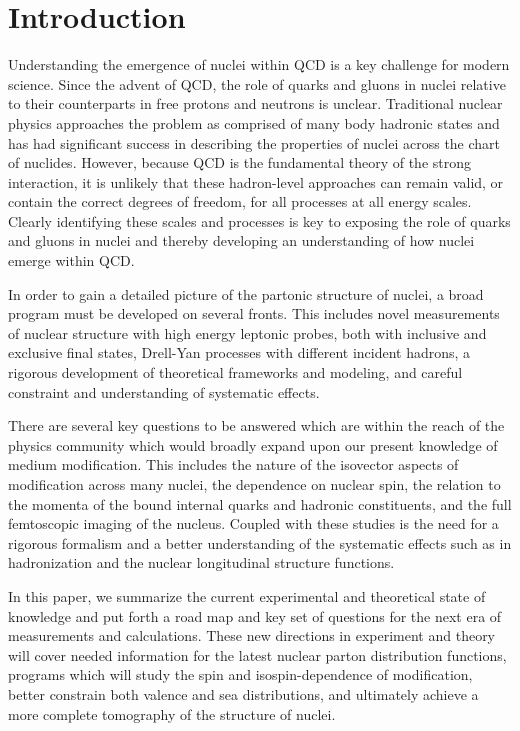 \section{Introduction}


Understanding the emergence of nuclei within QCD is a key challenge for modern science.  Since the advent of QCD, the role of quarks and gluons in nuclei relative to their counterparts in free protons and neutrons is unclear.  Traditional nuclear physics approaches the problem as comprised of many body hadronic states and has had significant success in describing the properties of nuclei across the chart of nuclides. However, because QCD is the fundamental theory of the strong interaction, it is unlikely that these hadron-level approaches can remain valid, or contain the correct degrees of freedom, for all processes at all energy scales. Clearly identifying these scales and processes is key to exposing the role of quarks and gluons in nuclei and thereby developing an understanding of how nuclei emerge within QCD.

In order to gain a detailed picture of the partonic structure of nuclei, a broad program must be developed on several fronts.  This includes novel measurements of nuclear structure with high energy leptonic probes, both with inclusive and exclusive final states, Drell-Yan processes with different incident hadrons, a rigorous development of theoretical frameworks and modeling, and  careful constraint and understanding of systematic effects.

There are several key questions to be answered which are within the reach of the physics community which would broadly expand upon our present knowledge of medium modification.  This includes the nature of the isovector aspects of modification across many nuclei, the dependence on nuclear spin, the relation to the momenta of the bound internal quarks and hadronic constituents, and the full femtoscopic imaging of the nucleus.  Coupled with these studies is the need for a rigorous formalism and a better understanding of the systematic effects such as in hadronization and the nuclear longitudinal structure functions. 

In this paper, we summarize the current experimental and theoretical state of knowledge and put forth a road map and key set of questions for the next era of measurements and calculations.  These new directions in experiment and theory will cover needed information for the latest nuclear parton distribution functions, programs which will study the spin and isospin-dependence of modification, better constrain both valence and sea distributions, and ultimately achieve a more complete tomography of the structure of nuclei.

